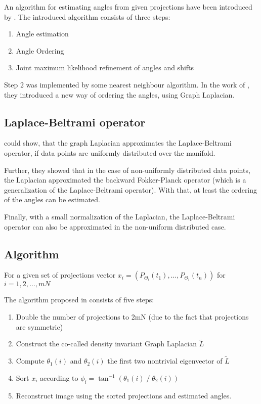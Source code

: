 An algorithm for estimating angles from given projections have been introduced by \cite{formerUnkownRandomProjections}.
The introduced algorithm consists of three steps:
\begin{enumerate}
    \item Angle estimation
    \item Angle Ordering
    \item Joint maximum likelihood refinement of angles and shifts
\end{enumerate}

Step 2 was implemented by some nearest neighbour algorithm. In the work of 
\cite{LaplaceRandomProjections}, they introduced a new way of ordering the angles,
using Graph Laplacian.


\subsection{Laplace-Beltrami operator}
\cite{LaplaceRandomProjections} could show, that the graph Laplacian
 approximates the Laplace-Beltrami operator, if data points are uniformly distributed 
 over the manifold.

 Further, they showed that in the case of non-uniformly distributed data points, the Laplacian
 approximated the backward Fokker-Planck operator (which is a generalization of the Laplace-Beltrami operator).
 With that, at least the ordering of the angles can be estimated.

 Finally, with a small normalization of the Laplacian, the Laplace-Beltrami operator can also be 
 approximated in the non-uniform distributed case.

\subsection{Algorithm}

For a given set of projections vector $x_i = ( P_{\Theta_i}(t_1), \dots, P_{\Theta_i}(t_n))$ for $i = 1,2, \dots, mN$

The algorithm proposed in \cite{LaplaceRandomProjections} consists of five steps:

\begin{enumerate}
    \item Double the number of projections to 2mN (due to the fact that projections are symmetric)
    \item Construct the co-called density invariant Graph Laplacian $\tilde{L}$
    \item Compute $\theta_1(i)$ and $\theta_2(i)$ the first two nontrivial eigenvector of $\tilde{L}$
    \item Sort $x_i$ according to $\phi_i = \tan^{-1}(\theta_1(i) \; / \;\theta_2(i))$
    \item Reconstruct image using the sorted projections and estimated angles.
\end{enumerate}

